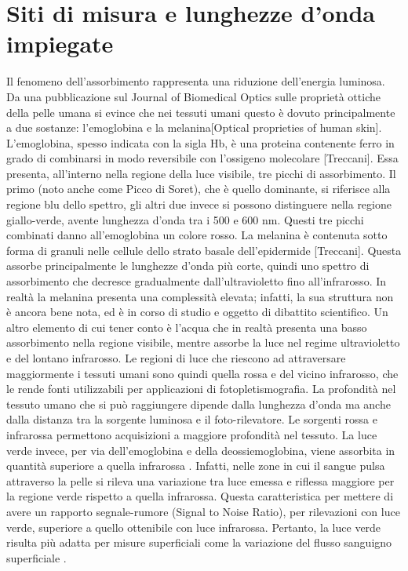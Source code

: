 \section{Siti di misura e lunghezze d'onda impiegate}
Il fenomeno dell'assorbimento rappresenta una riduzione dell'energia luminosa.
Da una pubblicazione sul Journal of Biomedical Optics sulle proprietà ottiche della pelle umana si evince che nei tessuti umani questo è dovuto principalmente a due sostanze: l'emoglobina e la melanina[Optical proprieties of human skin].
L'emoglobina, spesso indicata con la sigla Hb, è una proteina contenente ferro in grado di combinarsi in modo reversibile con l’ossigeno molecolare [Treccani]. Essa presenta, all'interno nella regione della luce visibile, tre picchi di assorbimento. Il primo (noto anche come Picco di Soret), che è quello dominante, si riferisce alla regione blu dello spettro, gli altri due invece si possono distinguere nella regione giallo-verde, avente lunghezza d'onda tra i 500 e 600 nm. Questi tre picchi combinati danno all'emoglobina un colore rosso.
La melanina è contenuta sotto forma di granuli nelle cellule dello strato basale dell’epidermide [Treccani]. Questa assorbe principalmente le lunghezze d'onda più corte, quindi uno spettro di assorbimento che decresce gradualmente dall'ultravioletto fino all'infrarosso. In realtà la melanina presenta una complessità elevata; infatti, la sua struttura non è ancora bene nota, ed è in corso di studio e oggetto di dibattito scientifico.
Un altro elemento di cui tener conto è l'acqua che in realtà presenta una basso assorbimento nella regione visibile, mentre assorbe la luce nel regime ultravioletto e del lontano infrarosso. Le regioni di luce che riescono ad attraversare maggiormente i tessuti umani sono quindi quella rossa e del vicino infrarosso, che le rende fonti utilizzabili per applicazioni di fotopletismografia.
La profondità nel tessuto umano che si può raggiungere dipende dalla lunghezza d'onda ma anche dalla distanza tra la sorgente luminosa e il foto-rilevatore. Le sorgenti rossa e infrarossa permettono acquisizioni a maggiore profondità nel tessuto. La luce verde invece, per via dell'emoglobina e della deossiemoglobina, viene assorbita in quantità superiore a quella infrarossa \cite{Lee2021}. Infatti, nelle zone in cui il sangue pulsa attraverso la pelle si rileva una variazione tra luce emessa e riflessa maggiore per la regione verde rispetto a quella infrarossa. Questa caratteristica per mettere di avere un rapporto segnale-rumore (Signal to Noise Ratio), per rilevazioni con luce verde, superiore a quello ottenibile con luce infrarossa. Pertanto, la luce verde risulta più adatta per misure superficiali come la variazione del flusso sanguigno superficiale \cite{Youssef2020}.

 